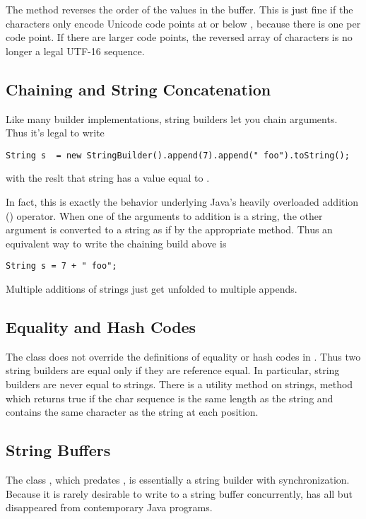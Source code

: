 The method  reverses the order of the 
values in the buffer.  This is just fine if the characters only encode
Unicode code points at or below , because there is one
 per code point.  If there are larger code points, the
reversed array of characters is no longer a legal UTF-16 sequence.


\subsection{Chaining and String Concatenation}

Like many builder implementations, string builders let you chain
arguments.  Thus it's legal to write
%
\begin{verbatim}
String s  = new StringBuilder().append(7).append(" foo").toString();
\end{verbatim}
%
with the reslt that string  has a value equal to
.

In fact, this is exactly the behavior underlying Java's heavily
overloaded addition (\code{+}) operator.  When one of the arguments to
addition is a string, the other argument is converted to a string as
if by the appropriate  method.  Thus an
equivalent way to write the chaining build above is
%
\begin{verbatim}
String s = 7 + " foo";
\end{verbatim}
%
Multiple additions of strings just get unfolded to multiple appends.


\subsection{Equality and Hash Codes}

The  class does not override the definitions of
equality or hash codes in .  Thus two string builders are
equal only if they are reference equal.  In particular, string
builders are never equal to strings.  There is a utility method on
strings,  method which
returns true if the char sequence is the same length as the string and
contains the same character as the string at each position.

\subsection{String Buffers}

The class , which predates
, is essentially a string builder with
synchronization.  Because it is rarely desirable to write to a
string buffer concurrently,  has all but
disappeared from contemporary Java programs.

